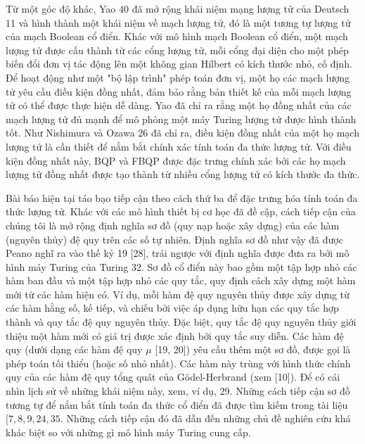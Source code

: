 \documentclass[10pt]{article}
\begin{document}
Từ một góc độ khác, Yao 40 đã mở rộng khái niệm mạng lượng tử của Deutsch 11 và hình thành một khái niệm về mạch lượng tử, đó là một tương tự lượng tử của mạch Boolean cổ điển. Khác với mô hình mạch Boolean cổ điển, một mạch lượng tử được cấu thành từ các cổng lượng tử, mỗi cổng đại diện cho một phép biến đổi đơn vị tác động lên một không gian Hilbert có kích thước nhỏ, cố định. Để hoạt động như một "bộ lập trình" phép toán đơn vị, một họ các mạch lượng tử yêu cầu điều kiện đồng nhất, đảm bảo rằng bản thiết kế của mỗi mạch lượng tử có thể được thực hiện dễ dàng. Yao đã chỉ ra rằng một họ đồng nhất của các mạch lượng tử đủ mạnh để mô phỏng một máy Turing lượng tử được hình thành tốt. Như Nishimura và Ozawa 26 đã chỉ ra, điều kiện đồng nhất của một họ mạch lượng tử là cần thiết để nắm bắt chính xác tính toán đa thức lượng tử. Với điều kiện đồng nhất này, BQP và FBQP được đặc trưng chính xác bởi các họ mạch lượng tử đồng nhất được tạo thành từ nhiều cổng lượng tử có kích thước đa thức.

Bài báo hiện tại táo bạo tiếp cận theo cách thứ ba để đặc trưng hóa tính toán đa thức lượng tử. Khác với các mô hình thiết bị cơ học đã đề cập, cách tiếp cận của chúng tôi là mở rộng định nghĩa sơ đồ (quy nạp hoặc xây dựng) của các hàm (nguyên thủy) đệ quy trên các số tự nhiên. Định nghĩa sơ đồ như vậy đã được Peano nghĩ ra vào thế kỷ 19 [28], trái ngược với định nghĩa được đưa ra bởi mô hình máy Turing của Turing 32. Sơ đồ cổ điển này bao gồm một tập hợp nhỏ các hàm ban đầu và một tập hợp nhỏ các quy tắc, quy định cách xây dựng một hàm mới từ các hàm hiện có. Ví dụ, mỗi hàm đệ quy nguyên thủy được xây dựng từ các hàm hằng số, kế tiếp, và chiếu bởi việc áp dụng hữu hạn các quy tắc hợp thành và quy tắc đệ quy nguyên thủy. Đặc biệt, quy tắc đệ quy nguyên thủy giới thiệu một hàm mới có giá trị được xác định bởi quy tắc suy diễn. Các hàm đệ quy (dưới dạng các hàm đệ quy $\mu$ [19, 20]) yêu cầu thêm một sơ đồ, được gọi là phép toán tối thiểu (hoặc số nhỏ nhất). Các hàm này trùng với hình thức chính quy của các hàm đệ quy tổng quát của Gödel-Herbrand (xem [10]). Để có cái nhìn lịch sử về những khái niệm này, xem, ví dụ, 29. Những cách tiếp cận sơ đồ tương tự để nắm bắt tính toán đa thức cổ điển đã được tìm kiếm trong tài liệu $[7,8,9,24,35$. Những cách tiếp cận đó đã dẫn đến những chủ đề nghiên cứu khá khác biệt so với những gì mô hình máy Turing cung cấp.
\end{document}
